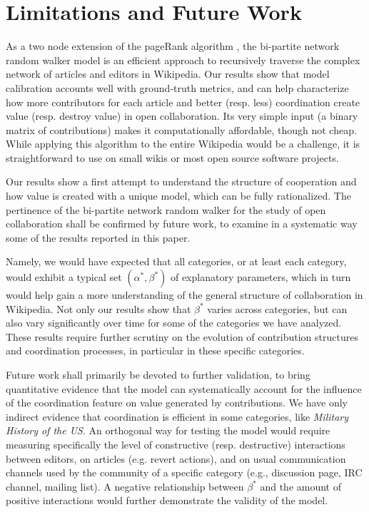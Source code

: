 \section{Limitations and Future Work}
As a two node extension of the pageRank algorithm \cite{page1999pagerank,kleinberg1999}, the {bi-partite network random walker} model is an efficient approach to recursively traverse the complex network of articles and editors in Wikipedia. Our results show that model calibration accounts well with ground-truth metrics, and can help characterize how more contributors for each article and better (resp. less) coordination create value (resp. destroy value) in open collaboration. Its very simple input (a binary matrix of contributions) makes it computationally affordable, though not cheap. While applying this algorithm to the entire Wikipedia would be a challenge, it is straightforward to use on small wikis or most open source software projects.

Our results show a first attempt to understand the structure of cooperation and how value is created with a unique model, which can be fully rationalized. The pertinence of the {bi-partite network random walker} for the study of open collaboration shall be confirmed by future work,  to examine in a systematic way some of the results reported in this paper.

Namely, we would have expected that all categories, or at least each category, would exhibit a typical set $(\alpha^{*},\beta^{*})$ of explanatory parameters, which in turn would help gain a more understanding of the general structure of collaboration in Wikipedia. Not only our results show that $\beta^{*}$ varies across categories, but can also vary significantly over time for some of the categories we have analyzed. These results require further scrutiny on the evolution of contribution structures and coordination processes, in particular in these specific categories. 

Future work shall primarily be devoted to further validation, to bring quantitative evidence that the model can systematically account for the influence of the coordination feature on value generated by contributions. We have only indirect evidence that coordination is efficient in some categories, like {\it Military History of the US}. An orthogonal way for testing the model would require measuring specifically the level of constructive (resp. destructive) interactions between editors, on articles (e.g. revert actions), and on usual communication channels used by the community of a specific category (e.g., discussion page, IRC channel, mailing list). A negative relationship between $\beta^{*}$ and the amount of positive interactions would further demonstrate the validity of the model.

